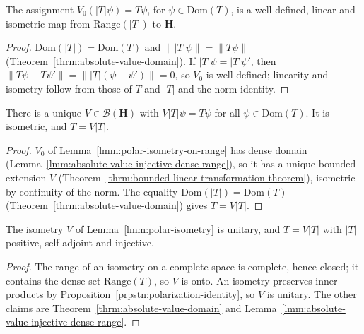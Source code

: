 \begin{lemma}
    \label{lmm:polar-isometry-on-range}
    \leanok
    The assignment $V_0(|T|\psi) = T\psi$, for $\psi \in \text{Dom}(T)$, is a well-defined, linear and isometric map from $\text{Range}(|T|)$ to $\mathbf{H}$.
\end{lemma}
\begin{proof}
    \leanok
    $\text{Dom}(|T|) = \text{Dom}(T)$ and $\||T|\psi\| = \|T\psi\|$ (Theorem~\ref{thrm:absolute-value-domain}). If $|T|\psi = |T|\psi'$, then $\|T\psi - T\psi'\| = \||T|(\psi - \psi')\| = 0$, so $V_0$ is well defined; linearity and isometry follow from those of $T$ and $|T|$ and the norm identity.
\end{proof}

\begin{lemma}
    \label{lmm:polar-isometry}
    \leanok
    There is a unique $V \in \mathcal{B}(\mathbf{H})$ with $V|T|\psi = T\psi$ for all $\psi \in \text{Dom}(T)$. It is isometric, and $T = V|T|$.
\end{lemma}
\begin{proof}
    \leanok
    $V_0$ of Lemma~\ref{lmm:polar-isometry-on-range} has dense domain (Lemma~\ref{lmm:absolute-value-injective-dense-range}), so it has a unique bounded extension $V$ (Theorem~\ref{thrm:bounded-linear-transformation-theorem}), isometric by continuity of the norm. The equality $\text{Dom}(|T|) = \text{Dom}(T)$ (Theorem~\ref{thrm:absolute-value-domain}) gives $T = V|T|$.
\end{proof}

\begin{theorem}
    \label{thrm:polar-decomposition}
    \leanok
    The isometry $V$ of Lemma~\ref{lmm:polar-isometry} is unitary, and $T = V|T|$ with $|T|$ positive, self-adjoint and injective.
\end{theorem}
\begin{proof}
    \leanok
    The range of an isometry on a complete space is complete, hence closed; it contains the dense set $\text{Range}(T)$, so $V$ is onto. An isometry preserves inner products by Proposition~\ref{prpstn:polarization-identity}, so $V$ is unitary. The other claims are Theorem~\ref{thrm:absolute-value-domain} and Lemma~\ref{lmm:absolute-value-injective-dense-range}.
\end{proof}

